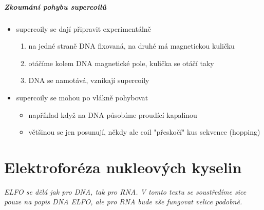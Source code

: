 \documentclass[DIV=8]{scrreprt}
\begin{document}
\paragraph{Zkoumání pohybu supercoilů}
\begin{itemize}[nosep]
    \item supercoily se dají připravit experimentálně
\begin{enumerate}[nosep]
    \item na jedné straně DNA fixovaná, na druhé má magnetickou kuličku
    \item otáčíme kolem DNA magnetické pole, kulička se otáčí taky
    \item DNA se namotává, vznikají supercoily
\end{enumerate}

    \item supercoily se mohou po vlákně pohybovat
\begin{itemize}[nosep]
    \item například když na DNA působíme proudící kapalinou
    \item většinou se jen posunují, někdy ale coil "přeskočí" kus sekvence (hopping)
\end{itemize}

\end{itemize}



\chapter{Elektroforéza nukleových kyselin} \label{Elektroforéza nukleových kyselin}


\emph{ELFO se dělá jak pro DNA, tak pro RNA. V tomto textu se soustředíme sice pouze na popis DNA ELFO, ale pro RNA bude vše fungovat velice podobně.}
\end{document}
